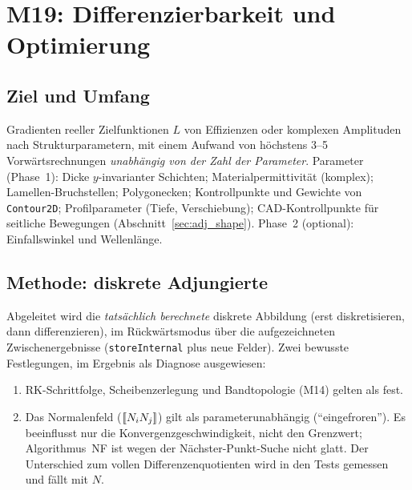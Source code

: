 \section{M19: Differenzierbarkeit und Optimierung}\label{sec:adjoint}

\subsection{Ziel und Umfang}
Gradienten reeller Zielfunktionen $L$ von Effizienzen oder komplexen Amplituden nach Strukturparametern, mit einem
Aufwand von höchstens 3--5 Vorwärtsrechnungen \emph{unabhängig von der Zahl der Parameter}. Parameter (Phase~1):
Dicke $y$-invarianter Schichten; Materialpermittivität (komplex); Lamellen-Bruchstellen; Polygonecken;
Kontrollpunkte und Gewichte von \verb|Contour2D|; Profilparameter (Tiefe, Verschiebung); CAD-Kontrollpunkte für
seitliche Bewegungen (Abschnitt~\ref{sec:adj_shape}). Phase~2 (optional): Einfallswinkel und Wellenlänge.

\subsection{Methode: diskrete Adjungierte}
Abgeleitet wird die \emph{tatsächlich berechnete} diskrete Abbildung (erst diskretisieren, dann differenzieren), im
Rückwärtsmodus über die aufgezeichneten Zwischenergebnisse (\verb|storeInternal| plus neue Felder). Zwei bewusste
Festlegungen, im Ergebnis als Diagnose ausgewiesen:
\begin{enumerate}[nosep]
  \item RK-Schrittfolge, Scheibenzerlegung und Bandtopologie (M14) gelten als fest.
  \item Das Normalenfeld ($[\![N_iN_j]\!]$) gilt als parameterunabhängig (\enquote{eingefroren}). Es beeinflusst nur die
        Konvergenzgeschwindigkeit, nicht den Grenzwert; Algorithmus~NF ist wegen der Nächster-Punkt-Suche nicht glatt.
        Der Unterschied zum vollen Differenzenquotienten wird in den Tests gemessen und fällt mit $N$.
\end{enumerate}

